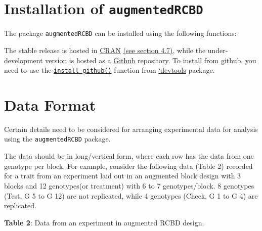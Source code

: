 \hypertarget{install}{%
\section{\texorpdfstring{Installation of
\texttt{augmentedRCBD}}{Installation of augmentedRCBD}}\label{install}}

The package \texttt{augmentedRCBD} can be installed using the following
functions:

\begin{Shaded}
\begin{Highlighting}[]
\NormalTok{(}\NormalTok{, }\NormalTok{)}


\NormalTok{(}\NormalTok{)}
\end{Highlighting}
\end{Shaded}

The stable release is hosted in
\href{https://CRAN.R-project.org/package=augmentedRCBD}{CRAN}
\protect\hyperlink{pack}{(see section 4.7)}, while the under-development
version is hosted as a
\href{https://github.com/aravind-j/augmentedRCBD}{Github} repository. To
install from github, you need to use the
\href{https://devtools.r-lib.org/reference/reexports.html}{\texttt{install\_github()}}
function from \href{https://devtools.r-lib.org/}{`devtools} package.

\hypertarget{data-format}{%
\section{Data Format}\label{data-format}}

Certain details need to be considered for arranging experimental data
for analysis using the \texttt{augmentedRCBD} package.

The data should be in long/vertical form, where each row has the data
from one genotype per block. For example, consider the following data
(Table 2) recorded for a trait from an experiment laid out in an
augmented block design with 3 blocks and 12 genotypes(or treatment) with
6 to 7 genotypes/block. 8 genotypes (Test, G 5 to G 12) are not
replicated, while 4 genotypes (Check, G 1 to G 4) are replicated.

\begin{center}
                \textbf{Table 2}: Data from an experiment in augmented RCBD design.
                \end{center}

